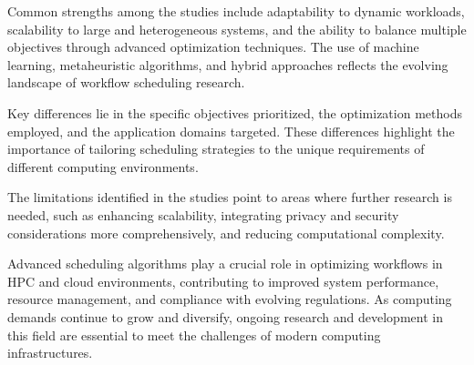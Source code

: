 \documentclass[a4paper, final]{article}
\begin{document}
Common strengths among the studies include adaptability to dynamic workloads, scalability to large and heterogeneous systems, 
and the ability to balance multiple objectives through advanced optimization techniques. The use of machine learning, 
metaheuristic algorithms, and hybrid approaches reflects the evolving landscape of workflow scheduling research.

Key differences lie in the specific objectives prioritized, the optimization methods employed, and the application domains 
targeted. These differences highlight the importance of tailoring scheduling strategies to the unique requirements of different 
computing environments.

The limitations identified in the studies point to areas where further research is needed, such as enhancing scalability, 
integrating privacy and security considerations more comprehensively, and reducing computational complexity.

Advanced scheduling algorithms play a crucial role in optimizing workflows in HPC and cloud environments, contributing to 
improved system performance, resource management, and compliance with evolving regulations. As computing demands continue to 
grow and diversify, ongoing research and development in this field are essential to meet the challenges of modern computing 
infrastructures.
\end{document}
